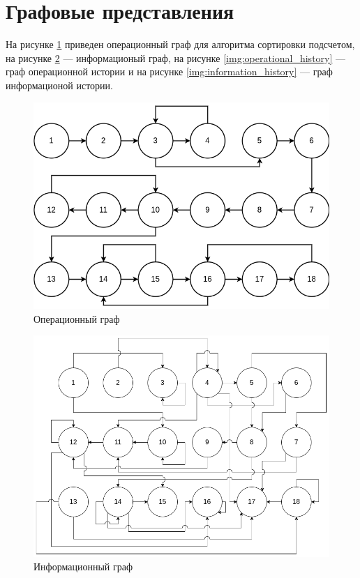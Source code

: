 \section{Графовые представления}

На рисунке \ref{img:operational} приведен операционный граф для алгоритма сортировки подсчетом, на рисунке \ref{img:information} --- информационый граф, на рисунке \ref{img:operational_history} --- граф операционной истории и на рисунке \ref{img:information_history} --- граф информационой истории.


\begin{figure}[H]
	\begin{center}
		\includegraphics[scale=0.5]{img/operational.png}
	\end{center}
	\captionsetup{justification=centering}
	\caption{Операционный граф}
	\label{img:operational}
\end{figure}

\begin{figure}[H]
	\begin{center}
		\includegraphics[scale=0.5]{img/information.png}
	\end{center}
	\captionsetup{justification=centering}
	\caption{Информационный граф}
	\label{img:information}
\end{figure}

